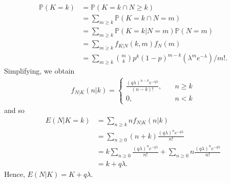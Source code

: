 \documentclass[12pt]{article}
\newcommand{\prob}{\mathbb{P}}
\theoremstyle{plain}
\theoremstyle{definition}
\theoremstyle{remark}
\numberwithin{equation}{section}  %
\begin{document}
\begin{align*}
\prob(K = k) & = \prob(K = k \cap N \ge k) 
\\
& = \sum_{m \ge k} \prob(K =
k \cap N = m) 
\\
& = \sum_{m \ge k} \prob(K = k | N = m) \prob(N = m)
\\
& = \sum_{m \ge k} f_{K|N}(k, m) f_N(m)
\\
& = \sum_{m \ge k}
\binom{m}{k} p^k {(1 - p)}^{m-k} (\lambda^m e^{-\lambda})/m!.
\end{align*}
Simplifying, we obtain
\begin{align*}
f_{N|K}(n|k) = 
\begin{cases}
\frac{{(q\lambda)}^{n-k} e^{-q\lambda}}{(n-k)!}, \quad & n \ge k
\\
0, \quad & n<k
\end{cases}
\end{align*}
and so 
\begin{align*}
E(N | K = k) & = \sum_{n \ge k} n f_{N|K}(n | k)
\\
& = \sum_{n \ge 0} (n + k) \frac{{(q \lambda)}^n e^{-q\lambda}}{n!}
\\
& = k \sum_{n \ge 0} \frac{{(q \lambda)}^n e^{-q\lambda}}{n!} + \sum_{n \ge 0}
n \frac{{(q\lambda)}^n e^{-q\lambda}}{n!} 
\\
& = k + q\lambda.
\end{align*}
Hence, $E(N|K) = K + q \lambda$.
\end{document}
